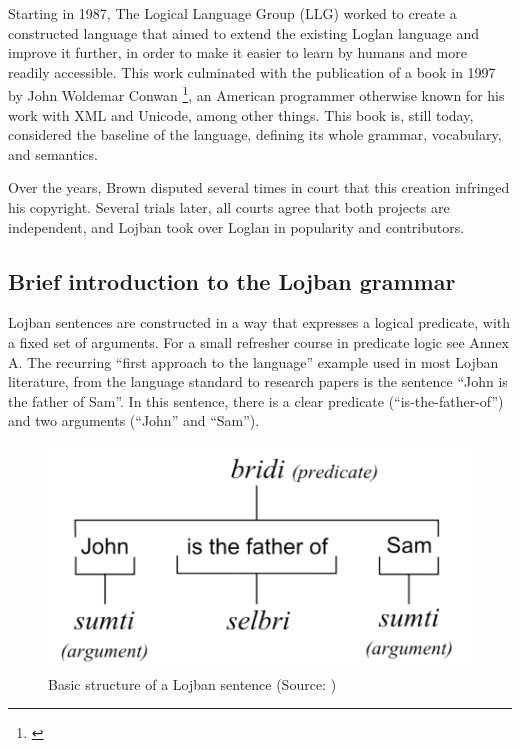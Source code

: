 Starting in 1987, The Logical Language Group (LLG) worked to create a constructed language that aimed to extend the existing Loglan language and improve it further,
in order to make it easier to learn by humans and more readily accessible. This work culminated with the publication of a book in 1997 by
John Woldemar Conwan \footnote{\cite{cowan1997complete}}, an American programmer otherwise known for his work with XML and Unicode, among other things. This book is,
still today, considered the baseline of the language, defining its whole grammar, vocabulary, and semantics.\newline

Over the years, Brown disputed several times in court that this creation infringed his copyright. Several trials later, all courts agree that both projects are independent,
and Lojban took over Loglan in popularity and contributors.

\subsection{Brief introduction to the Lojban grammar}

Lojban sentences are constructed in a way that expresses a logical predicate, with a fixed set of arguments. For a small
refresher course in predicate logic see Annex A. The recurring ``first approach to the language'' example used in most Lojban
literature, from the language standard to research papers is the sentence ``John is the father of Sam''. In this sentence, there
is a clear predicate (``is-the-father-of'') and two arguments (``John'' and ``Sam'').

\begin{figure}[H]
\centering
\includegraphics[scale=0.20]{images/lojban_grammar.png}
\caption{Basic structure of a Lojban sentence (Source: \cite{cowan1997complete})}
\end{figure}

